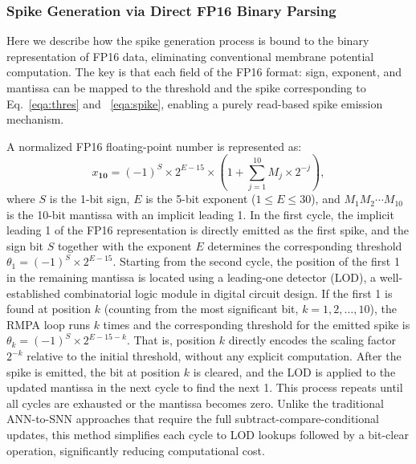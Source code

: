 \subsubsection{Spike Generation via Direct FP16 Binary Parsing}
\label{subsec:spike-gen-via-fp16-binary-parsing}
Here we describe how the spike generation process is  bound to the binary representation of FP16 data, eliminating conventional membrane potential computation. The key is that each field of the FP16 format: sign, exponent, and mantissa can be mapped to the threshold and the spike corresponding to Eq.~\eqref{eqa:thres} and ~\eqref{eqa:spike}, enabling a purely read-based spike emission mechanism.

A normalized FP16 floating-point number is represented as:
\begin{equation}
    x_{\textbf{10}} = (-1)^{S} \times 2^{E-15} \times \left(1 + \sum_{j=1}^{10} M_j \times 2^{-j}\right),
\end{equation}
where $S$ is the 1-bit sign, $E$ is the 5-bit exponent ($1 \leq E \leq 30$), and $M_1 M_2 \cdots M_{10}$ is the 10-bit mantissa with an implicit leading 1. 
In the first cycle, the implicit leading 1 of the FP16 representation is directly emitted as the first spike, and the sign bit $S$ together with the exponent $E$ determines the corresponding threshold $\theta_1 = (-1)^{S} \times 2^{E-15}$. Starting from the second cycle, the position of the first 1 in the remaining mantissa is located using a leading-one detector (LOD), a well-established combinatorial logic module in digital circuit design. If the first 1 is found at position $k$ (counting from the most significant bit, $k = 1, 2, \ldots, 10$), the RMPA loop runs $k$ times and the corresponding threshold for the emitted spike is $\theta_k = (-1)^{S} \times 2^{E-15-k}.$ That is, position $k$ directly encodes the scaling factor $2^{-k}$ relative to the initial threshold, without any explicit computation. After the spike is emitted, the bit at position $k$ is cleared, and the LOD is applied to the updated mantissa in the next cycle to find the next 1. This process repeats until all cycles are exhausted or the mantissa becomes zero. Unlike the traditional ANN-to-SNN approaches that require the full subtract-compare-conditional updates, this method simplifies each cycle to LOD lookups followed by a bit-clear operation, significantly reducing computational cost.

